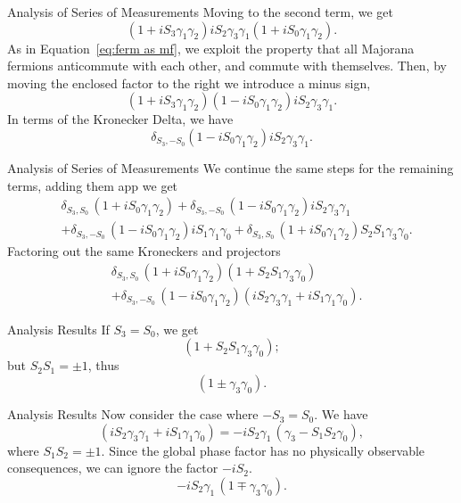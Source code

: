 \documentclass{loyola-beamer}
\begin{document}
\begin{frame}{Analysis of Series of Measurements}
	Moving to the second term, we get
	\[
		(1 + iS_3 \gamma_1 \gamma_2) iS_2 \gamma_3 \gamma_1 (1 + iS_0 \gamma_1 \gamma_2).
	\]
	As in Equation~\ref{eq:ferm as mf}, we exploit the property that all Majorana fermions anticommute with each other, and commute with themselves. Then, by moving the enclosed factor to the right we introduce a minus sign,
	\[
		(1 + iS_3 \gamma_1 \gamma_2)(1 - iS_0 \gamma_1 \gamma_2) iS_2 \gamma_3 \gamma_1 .
	\]
	In terms of the Kronecker Delta, we have
	\[
		\delta_{S_3, -S_0}(1 - iS_0 \gamma_1 \gamma_2)iS_2 \gamma_3 \gamma_1 .
	\]
\end{frame}

\begin{frame}{Analysis of Series of Measurements}
	We continue the same steps for the remaining terms, adding them app we get
	\[
		\begin{aligned}
			 & \delta_{S_3, S_0} \, (1 + iS_0 \gamma_1 \gamma_2)
			+\delta_{S_3, -S_0}\, (1 - iS_0 \gamma_1 \gamma_2)iS_2 \gamma_3 \gamma_1    \\
			 & +\delta_{S_3, -S_0}\, (1 - iS_0 \gamma_1 \gamma_2)iS_1 \gamma_1 \gamma_0
			+\delta_{S_3, S_0}\, (1 + iS_0 \gamma_1 \gamma_2)S_2 S_1 \gamma_3 \gamma_0 .
		\end{aligned}
	\]
	Factoring out the same Kroneckers and projectors
	\begin{equation}
		\begin{aligned}
			 & \delta_{S_3, S_0} \, (1 + iS_0 \gamma_1 \gamma_2)  ( 1 + S_2 S_1 \gamma_3 \gamma_0 )                    \\
			 & +\delta_{S_3, -S_0} \, (1 - iS_0 \gamma_1 \gamma_2) ( iS_2 \gamma_3 \gamma_1 +iS_1 \gamma_1 \gamma_0) .
		\end{aligned}
		\label{eq:seq 8 mfs}
	\end{equation}
\end{frame}

\begin{frame}{Analysis Results}
	If $ S_3 = S_0 $, we get
	\[
		( 1 + S_2 S_1 \gamma_3 \gamma_0 );
	\]
	but $ S_2 S_1 = \pm 1 $, thus
	\[
		( 1 \pm \gamma_3 \gamma_0 ).
	\]
\end{frame}

\begin{frame}{Analysis Results}
	Now consider the case where $ -S_3 = S_0 $. We have
	\[
		( iS_2 \gamma_3 \gamma_1 +iS_1 \gamma_1 \gamma_0)
		= -i S_2 \gamma_1\, ( \gamma_3 - S_1 S_2 \gamma_0) ,
	\]
	where $ S_1 S_2 = \pm 1 $. Since the global phase factor has no physically observable consequences, we can ignore the factor $ -iS_2 $.
	\[
		-iS_2 \gamma_1\, (1 \mp \gamma_3 \gamma_0).
	\]
\end{frame}
\end{document}
